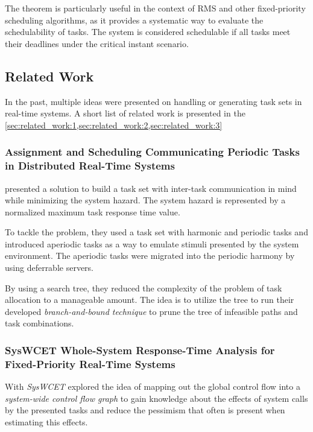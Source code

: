 The theorem is particularly useful in the context of \ac{RMS} and other fixed-priority scheduling algorithms, as it provides a systematic way to evaluate the schedulability of tasks.
The system is considered schedulable if all tasks meet their deadlines under the critical instant scenario.

\subsection{Related Work}\label{sec:related_work}
In the past, multiple ideas were presented on handling or generating task sets in real-time systems.
A short list of related work is presented in the \cref{sec:related_work:1,sec:related_work:2,sec:related_work:3}

\subsubsection{Assignment and Scheduling Communicating Periodic Tasks in Distributed Real-Time Systems}\label{sec:related_work:1}
\textcite{dar-tzenpengAssignmentSchedulingCommunicating1997} presented a solution to build a task set with inter-task communication in mind while minimizing the system hazard.
The system hazard is represented by a normalized maximum task response time value.

To tackle the problem, they used a task set with harmonic and periodic tasks and introduced aperiodic tasks as a way to emulate stimuli presented by the system environment.
The aperiodic tasks were migrated into the periodic harmony by using deferrable servers.

By using a search tree, they reduced the complexity of the problem of task allocation to a manageable amount.
The idea is to utilize the tree to run their developed \textit{branch-and-bound technique} to prune the tree of infeasible paths and task combinations.

\subsubsection{SysWCET\: Whole-System Response-Time Analysis for Fixed-Priority Real-Time Systems}\label{sec:related_work:2}
With \textit{SysWCET} \textcite{dietrichSysWCETWholeSystemResponseTime} explored the idea of mapping out the global control flow into a \textit{system-wide control flow graph} to gain knowledge about the effects of system calls by the presented tasks and reduce the pessimism that often is present when estimating this effects.

